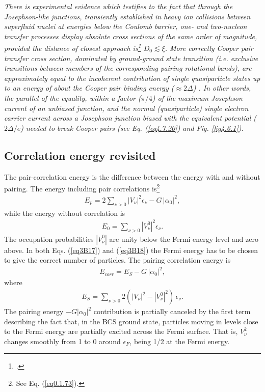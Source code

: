 \textit{There is experimental evidence which testifies to the fact that through the Josephson-like junctions, transiently established in heavy ion collisions between superfluid nuclei at energies below the Coulomb barrier, one- and two-nucleon transfer processes display absolute cross sections of the same order of magnitude, provided the distance of closest approach is\footnote{\cite{Potel:21}.} $D_0\lesssim\xi$.  More correctly Cooper pair transfer cross section, dominated by ground-ground state transition (i.e. exclusive transitions between members of the corresponding pairing rotational bands), are approximately equal to the incoherent contribution of single quasiparticle states up to an energy of about the Cooper pair binding energy ($\approx2\Delta$) . In other words, the parallel of the equality, within a factor ($\pi/4$) of the maximum Josephson current of an unbiased junction, and the normal (quasiparticle) single electron carrier current across a Josephson junction biased with the equivalent potential ($2\Delta/e$) needed to  break Cooper pairs (see Eq. (\ref{eq4.7.20}) and Fig. \ref{fig4.6.1}).} 
\subsection{Correlation energy revisited}\label{App3B4}
The pair-correlation energy is the difference between the energy with and without pairing. The energy including pair correlations is\footnote{See Eq. (\ref{eq0.1.73}).} 
 \begin{align}\label{eq3B17}
E_p=2\sum_{\nu>0}|V_\nu|^2\epsilon_\nu-G\,|\alpha_0|^2,
 \end{align} 
 while the energy without correlation is
  \begin{align}\label{eq3B18}
  E_0=\sum_{\nu>0}|V^0_\nu|^2\epsilon_\nu.
  \end{align} 
 The occupation probabilities $|V^0_\nu|$ are unity below the Fermi energy level and zero above. In both Eqs. (\ref{eq3B17}) and (\ref{eq3B18}) the Fermi energy has to be chosen to give the correct number of particles. The pairing correlation energy is 
   \begin{align}\label{eq3B19}
E_{corr}=E_S-G\,|\alpha_0|^2,
   \end{align} 
 where
   \begin{align}\label{eq3B20}
E_S=\sum_{\nu>0}2(|V_\nu|^2-|V^0_\nu|^2)\,\epsilon_\nu.
   \end{align}  
 The  pairing energy $-G|\alpha_0|^2$ contribution is partially canceled by the first term describing the fact that, in the BCS ground state, particles moving in levels close to the Fermi energy are partially excited across the Fermi surface. That is, $V_\nu^2$ changes smoothly from 1 to 0 around $\epsilon_F$, being 1/2 at the Fermi energy.
 
